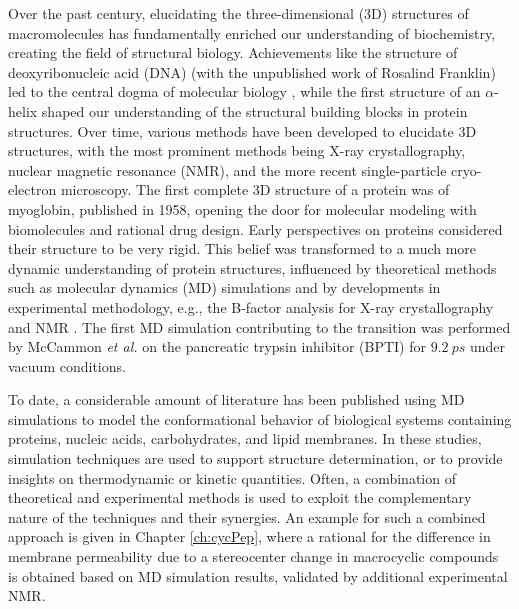 Over the past century, elucidating the three-dimensional (3D) structures of macromolecules has fundamentally enriched our understanding of biochemistry,\cite{Wagner1997, Shi2014} creating the field of structural biology. Achievements like the structure of deoxyribonucleic acid (DNA)\cite{Watson1953} (with the unpublished work of Rosalind Franklin\cite{Elkin2003}) led to the central dogma of molecular biology \cite{Crick1970}, while the first structure of an $\alpha$-helix \cite{Pauling1951} shaped our understanding of the structural building blocks in protein structures. Over time, various methods have been developed to elucidate 3D structures, with the most prominent methods being X-ray crystallography\cite{Ladd1977, Shi2014}, nuclear magnetic resonance (NMR),\cite{Wagner1997,  Shi2014, Jacobsen2007, Markwick2008} and the more recent single-particle cryo-electron microscopy\cite{Doerr2016, Agard2014, Cheng2017, Kuhlbrandt2014}. The first complete 3D structure of a protein was of myoglobin\cite{Kendrew1958}, published in 1958, opening the door for molecular modeling with biomolecules and rational drug design.
Early perspectives on proteins considered their structure to be very rigid.  \cite{Karplus2002} This belief was transformed to a much more dynamic understanding of protein structures, influenced by theoretical methods such as molecular dynamics (MD) simulations \cite{Karplus2002, Phillips1981} and by developments in experimental methodology, e.g., the B-factor analysis for X-ray crystallography\cite{Frauenfelder1979} and NMR \cite{Wuthrich1975, Torchia1984, Dobson1986}. The first MD simulation contributing to the transition was performed by McCammon \textit{et al.} on the pancreatic trypsin inhibitor (BPTI) for $9.2~ps$ under vacuum conditions. \cite{Mccammon1977} 

To date, a considerable amount of literature has been published using MD simulations to model the conformational behavior of biological systems containing proteins, nucleic acids, carbohydrates, and lipid membranes. \cite{Leach2001, Karplus2002, Chavent2014, Hollingsworth2018} In these studies, simulation techniques are used to support structure determination, or to provide insights on thermodynamic or kinetic quantities. \cite{Gunsteren1990, Karplus2002} 
Often, a combination of theoretical and experimental methods is used to exploit the complementary nature of the techniques and their synergies. \cite{Gunsteren2008} An example for such a combined approach is given in Chapter \ref{ch:cycPep}, where a rational for the difference in membrane permeability due to a stereocenter change in macrocyclic compounds   is obtained based on MD simulation results,  validated by additional experimental NMR.

